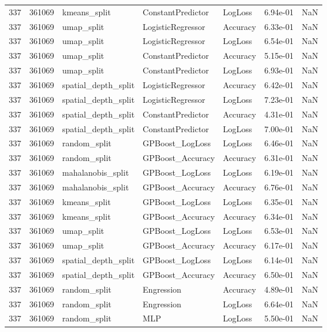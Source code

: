 \begin{tabular}{rrlllrr}
337 & 361069 & kmeans\_split & ConstantPredictor & LogLoss & 6.94e-01 & NaN \\
337 & 361069 & umap\_split & LogisticRegressor & Accuracy & 6.33e-01 & NaN \\
337 & 361069 & umap\_split & LogisticRegressor & LogLoss & 6.54e-01 & NaN \\
337 & 361069 & umap\_split & ConstantPredictor & Accuracy & 5.15e-01 & NaN \\
337 & 361069 & umap\_split & ConstantPredictor & LogLoss & 6.93e-01 & NaN \\
337 & 361069 & spatial\_depth\_split & LogisticRegressor & Accuracy & 6.42e-01 & NaN \\
337 & 361069 & spatial\_depth\_split & LogisticRegressor & LogLoss & 7.23e-01 & NaN \\
337 & 361069 & spatial\_depth\_split & ConstantPredictor & Accuracy & 4.31e-01 & NaN \\
337 & 361069 & spatial\_depth\_split & ConstantPredictor & LogLoss & 7.00e-01 & NaN \\
337 & 361069 & random\_split & GPBoost\_LogLoss & LogLoss & 6.46e-01 & NaN \\
337 & 361069 & random\_split & GPBoost\_Accuracy & Accuracy & 6.31e-01 & NaN \\
337 & 361069 & mahalanobis\_split & GPBoost\_LogLoss & LogLoss & 6.19e-01 & NaN \\
337 & 361069 & mahalanobis\_split & GPBoost\_Accuracy & Accuracy & 6.76e-01 & NaN \\
337 & 361069 & kmeans\_split & GPBoost\_LogLoss & LogLoss & 6.35e-01 & NaN \\
337 & 361069 & kmeans\_split & GPBoost\_Accuracy & Accuracy & 6.34e-01 & NaN \\
337 & 361069 & umap\_split & GPBoost\_LogLoss & LogLoss & 6.53e-01 & NaN \\
337 & 361069 & umap\_split & GPBoost\_Accuracy & Accuracy & 6.17e-01 & NaN \\
337 & 361069 & spatial\_depth\_split & GPBoost\_LogLoss & LogLoss & 6.14e-01 & NaN \\
337 & 361069 & spatial\_depth\_split & GPBoost\_Accuracy & Accuracy & 6.50e-01 & NaN \\
337 & 361069 & random\_split & Engression & Accuracy & 4.89e-01 & NaN \\
337 & 361069 & random\_split & Engression & LogLoss & 6.64e-01 & NaN \\
337 & 361069 & random\_split & MLP & LogLoss & 5.50e-01 & NaN \\

\end{tabular}
